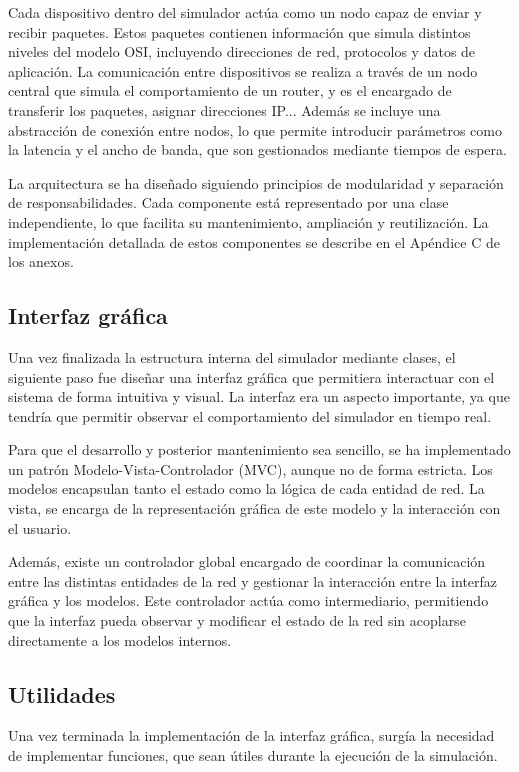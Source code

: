 Cada dispositivo dentro del simulador actúa como un nodo capaz de enviar y recibir paquetes. Estos paquetes contienen información que simula distintos niveles del modelo OSI, incluyendo direcciones de red, protocolos y datos de aplicación. La comunicación entre dispositivos se realiza a través de un nodo central que simula el comportamiento de un router, y es el encargado de transferir los paquetes, asignar direcciones IP... Además se incluye una abstracción de conexión entre nodos, lo que permite introducir parámetros como la latencia y el ancho de banda, que son gestionados mediante tiempos de espera.

La arquitectura se ha diseñado siguiendo principios de modularidad y separación de responsabilidades. Cada componente está representado por una clase independiente, lo que facilita su mantenimiento, ampliación y reutilización. La implementación detallada de estos componentes se describe en el Apéndice C de los anexos.

\subsection{Interfaz gráfica}
\label{subsec:InterfazGrafica}
Una vez finalizada la estructura interna del simulador mediante clases, el siguiente paso fue diseñar una interfaz gráfica que permitiera interactuar con el sistema de forma intuitiva y visual. La interfaz era un aspecto importante, ya que tendría que permitir observar el comportamiento del simulador en tiempo real.

Para que el desarrollo y posterior mantenimiento sea sencillo, se ha implementado un patrón Modelo-Vista-Controlador (MVC), aunque no de forma estricta. Los modelos encapsulan tanto el estado como la lógica de cada entidad de red. La vista, se encarga de la representación gráfica de este modelo y la interacción con el usuario.

Además, existe un controlador global encargado de coordinar la comunicación entre las distintas entidades de la red y gestionar la interacción entre la interfaz gráfica y los modelos. Este controlador actúa como intermediario, permitiendo que la interfaz pueda observar y modificar el estado de la red sin acoplarse directamente a los modelos internos.

\subsection{Utilidades}
\label{subsec:Utilidades}
Una vez terminada la implementación de la interfaz gráfica, surgía la necesidad de implementar funciones, que sean útiles durante la ejecución de la simulación.

